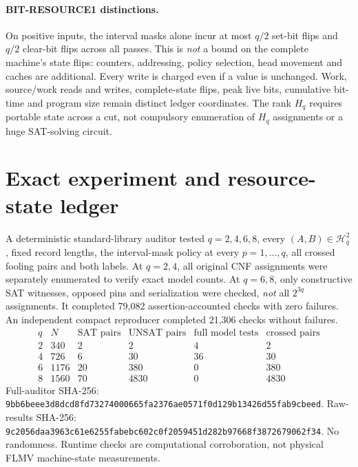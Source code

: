 \documentclass[11pt]{article}
\begin{document}
\paragraph{BIT-RESOURCE1 distinctions.}
On positive inputs, the interval masks alone incur at most $q/2$ set-bit flips and $q/2$ clear-bit flips across all passes. This is \emph{not} a bound on the complete machine's state flips: counters, addressing, policy selection, head movement and caches are additional. Every write is charged even if a value is unchanged. Work, source/work reads and writes, complete-state flips, peak live bits, cumulative bit-time and program size remain distinct ledger coordinates. The rank $H_q$ requires portable state across a cut, not compulsory enumeration of $H_q$ assignments or a huge SAT-solving circuit.

\section{Exact experiment and resource-state ledger}
A deterministic standard-library auditor tested $q=2,4,6,8$, every $(A,B)\in\mathcal H_q^2$, fixed record lengths, the interval-mask policy at every $p=1,\ldots,q$, all crossed fooling pairs and both labels. At $q=2,4$, all original CNF assignments were separately enumerated to verify exact model counts. At $q=6,8$, only constructive SAT witnesses, opposed pins and serialization were checked, \emph{not} all $2^{3q}$ assignments. It completed 79,082 assertion-accounted checks with zero failures. An independent compact reproducer completed 21,306 checks without failures.
\[
\begin{array}{c|rrrrr}
q&N&\text{SAT pairs}&\text{UNSAT pairs}&\text{full model tests}&\text{crossed pairs}\\\hline
2&340&2&2&4&2\\
4&726&6&30&36&30\\
6&1176&20&380&0&380\\
8&1560&70&4830&0&4830
\end{array}
\]
Full-auditor SHA-256: \texttt{9bb6beee3d8dcd8fd73274000665fa2376ae0571f0d129b13426d55fab9cbeed}. Raw-results SHA-256: \texttt{9c2056daa3963c61e6255fabebc602c0f2059451d282b97668f3872679062f34}. No randomness. Runtime checks are computational corroboration, not physical FLMV machine-state measurements.
\end{document}
